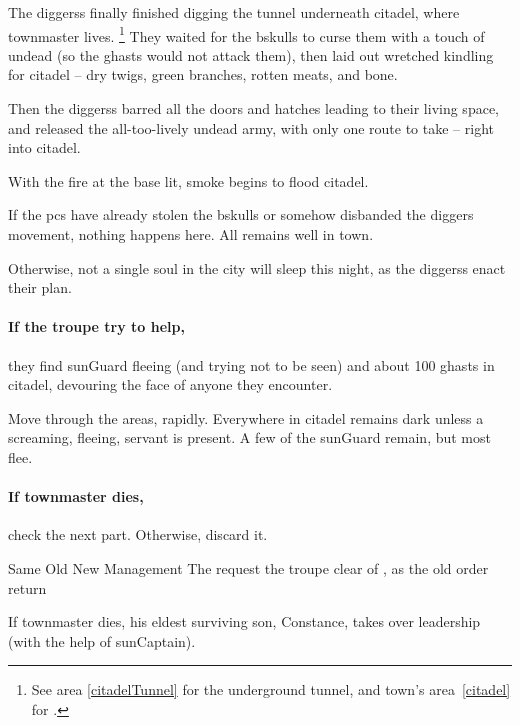\begin{exampletext}
  The \glspl{diggers} finally finished digging the tunnel underneath \gls{citadel}, where \gls{townmaster} lives.%
  \footnote{See \gls{area} \vref{citadelTunnel} for the underground tunnel, and \gls{town}'s \gls{area}~\vref{citadel} for .}
  They waited for the \gls{bskulls} to curse them with a touch of undead (so the \glspl{ghast} would not attack them), then laid out wretched kindling for \gls{citadel} -- dry twigs, green branches, rotten meats, and bone.

  Then the \glspl{diggers} barred all the doors and hatches leading to their living space, and released the all-too-lively undead army, with only one route to take -- right into \gls{citadel}.

  With the fire at the base lit, smoke begins to flood \gls{citadel}.
\end{exampletext}

If the \glspl{pc} have already stolen the \gls{bskulls} or somehow disbanded the \gls{diggers} movement, nothing happens here.
All remains well in \gls{town}.

Otherwise, not a single soul in the city will sleep this night, as the \glspl{diggers} enact their plan.

\paragraph{If the troupe try to help,}
they find \gls{sunGuard} fleeing (and trying not to be seen) and about 100 \glspl{ghast} in \gls{citadel}, devouring the face of anyone they encounter.

Move through the areas, rapidly.
Everywhere in \gls{citadel} remains dark unless a screaming, fleeing, servant is present.
A few of the \gls{sunGuard} remain, but most flee.


\paragraph{If \gls{townmaster} dies,}
check the next part.
Otherwise, discard it.

{Same Old New Management}%
{The  request the troupe clear  of , as the old order return}%

If \gls{townmaster} dies, his eldest surviving son, Constance, takes over leadership (with the help of \gls{sunCaptain}).

